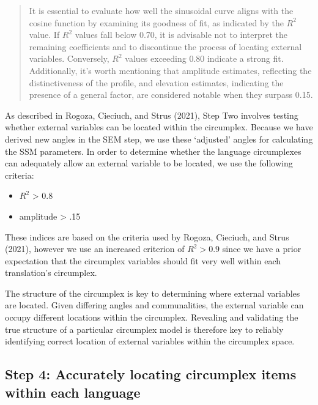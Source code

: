 \documentclass[
  default,
]{sn-jnl}
\providecommand{\tightlist}{%
  \setlength{\itemsep}{0pt}\setlength{\parskip}{0pt}}
\begin{document}
\begin{quote}
It is essential to evaluate how well the sinusoidal curve aligns with
the cosine function by examining its goodness of fit, as indicated by
the \(R^2\) value. If \(R^2\) values fall below 0.70, it is advisable
not to interpret the remaining coefficients and to discontinue the
process of locating external variables. Conversely, \(R^2\) values
exceeding 0.80 indicate a strong fit. Additionally, it's worth
mentioning that amplitude estimates, reflecting the distinctiveness of
the profile, and elevation estimates, indicating the presence of a
general factor, are considered notable when they surpass 0.15.
\end{quote}

As described in Rogoza, Cieciuch, and Strus (2021), Step Two involves
testing whether external variables can be located within the circumplex.
Because we have derived new angles in the SEM step, we use these
`adjusted' angles for calculating the SSM parameters. In order to
determine whether the language circumplexes can adequately allow an
external variable to be located, we use the following criteria:

\begin{itemize}
\tightlist
\item
  \(R^2\) \textgreater{} 0.8
\item
  amplitude \textgreater{} .15
\end{itemize}

These indices are based on the criteria used by Rogoza, Cieciuch, and
Strus (2021), however we use an increased criterion of \(R^2 > 0.9\)
since we have a prior expectation that the circumplex variables should
fit very well within each translation's circumplex.

The structure of the circumplex is key to determining where external
variables are located. Given differing angles and communalities, the
external variable can occupy different locations within the circumplex.
Revealing and validating the true structure of a particular circumplex
model is therefore key to reliably identifying correct location of
external variables within the circumplex space.

\subsection{Step 4: Accurately locating circumplex items within each
language}\label{step-4-accurately-locating-circumplex-items-within-each-language}
\end{document}
